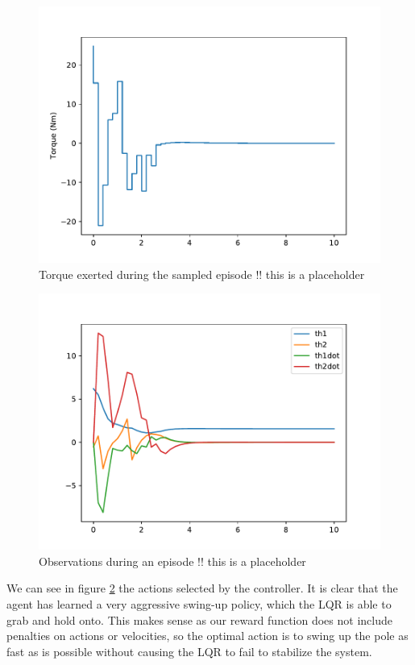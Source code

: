 \documentclass[letterpaper, 10 pt, conference]{ieeeconf}
\begin{document}
 \begin{figure}[h!]
\centering
  \includegraphics[scale=.5]{act_hist.pdf}
  \caption{Torque exerted during the sampled episode !! this is a placeholder}
  \label{fig:act}
\end{figure}

\begin{figure}[h!]
\centering
  \includegraphics[scale=.5]{obs_hist.pdf}
  \caption{Observations during an episode !! this is a placeholder}
  \label{fig:act}
\end{figure}


We can see in figure \ref{fig:act} the actions selected by the controller. It is clear that the agent has learned a very aggressive swing-up policy, which the LQR is able to grab and hold onto. This makes sense as our reward function does not include penalties on actions or velocities, so the optimal action is to swing up the pole as fast as is possible without causing the LQR to fail to stabilize the system.  
\end{document}
